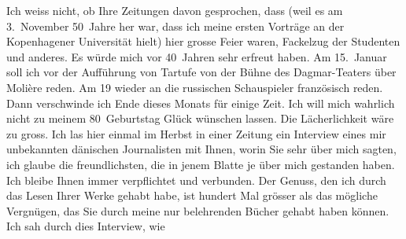 \begin{ledgroupsized}[t]{13cm}
           Ich weiss nicht, ob Ihre Zeitungen davon gesprochen, dass (weil es am
                  3. November 50 Jahre her war, dass ich meine ersten Vorträge an der
                  Kopenhagener Universität hielt) hier grosse Feier
               waren, Fackelzug der Studenten {\pb}und anderes. Es würde mich vor 40 Jahren sehr erfreut haben.\pend
           \pstart
           Am 15. Januar soll ich vor der Aufführung von Tartufe von der Bühne des Dagmar-Teaters über Molière reden. Am
                  19 wieder an die russischen
               Schauspieler französisch reden.\pend
           \pstart
           Dann verschwinde ich Ende dieses Monats für einige Zeit. Ich will mich wahrlich nicht
               zu meinem 80 Geburtstag Glück wünschen lassen. Die Lächerlichkeit wäre zu gross.\pend
           \pstart
           Ich las hier einmal im Herbst in einer Zeitung ein
               Interview eines mir
               unbekannten { }dänischen Journalisten mit
               Ihnen, worin Sie sehr \label{K_L02373-1v}\label{K_L02373-1h} über mich
               sagten, ich glaube die freundlichsten, die in jenem Blatte je über mich gestanden
               haben.\pend
           \pstart
           Ich bleibe Ihnen immer verpflichtet und {\pb}verbunden. Der Genuss, den ich
               durch das Lesen Ihrer Werke gehabt habe, ist hundert Mal grösser als das mögliche
               Vergnügen, das Sie durch meine nur belehrenden Bücher gehabt haben können.\pend
           \pstart
           Ich sah durch dies Interview, wie

\end{ledgroupsized}
